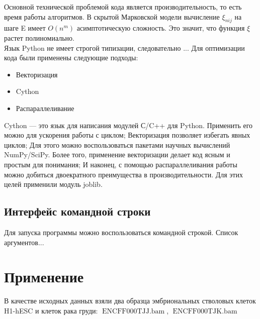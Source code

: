 \documentclass{matmex-diploma-custom}
\begin{document}
Основной технической проблемой кода является производительность, то есть время работы алгоритмов. В скрытой Марковской модели вычисление $\xi_{nij}$ на шаге E имеет $O(n^m)$ асимптотическую сложность. Это значит, что функция $\xi$ растет полиномиально.
\\
Язык Python не имеет строгой типизации, следовательно ...
Для оптимизации кода были применены следующие подходы:

\begin{itemize}
  \item Векторизация
  \item Cython
  \item Распараллеливание
\end{itemize}

Cython --- это язык для написания модулей С/C++ для Python. Применить его можно для ускорения работы с циклом; Векторизация позволяет избегать явных циклов; Для этого можно воспользоваться пакетами научных вычислений NumPy/SciPy. Более того, применение векторизации делает код ясным и простым для понимания; И наконец, с помощью распараллеливания работы можно добиться двоекратного преимущества в производительности. Для этих целей применили модуль joblib.

\subsection{Интерфейс командной строки}
Для запуска программы можно воспользоваться командной строкой. 
Список аргументов...

\section{Применение}
В качестве исходных данных взяли два образца эмбриональных стволовых клеток H1-hESC и клеток рака груди: $\operatorname{ENCFF000TJJ.bam}$, $\operatorname{ENCFF000TJK.bam}$
\end{document}
